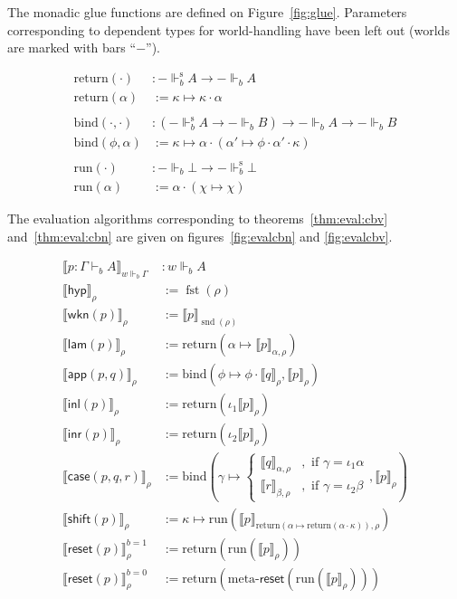 \documentclass{eptcs}
\newcommand{\hyp}{\mathsf{hyp}}
\newcommand{\wkn}[1]{\mathsf{wkn}{(#1)}}
\newcommand{\inl}[1]{\mathsf{inl}{(#1)}}
\newcommand{\inr}[1]{\mathsf{inr}{(#1)}}
\newcommand{\lam}[1]{\mathsf{lam}{(#1)}}
\newcommand{\reset}[1]{\mathsf{reset}{(#1)}}
\newcommand{\shift}[1]{\mathsf{shift}{(#1)}}
\newcommand{\casemy}[3]{\mathsf{case}({#1},{#2},{#3})}
\newcommand{\app}[2]{\mathsf{app}({#1},{#2})}
\DeclareMathOperator{\Fst}{fst}
\DeclareMathOperator{\Snd}{snd}
\newcommand{\forces}[3]{{#1}\Vdash_{#2}{#3}}
\newcommand{\sforces}[3]{{#1}\Vdash^{\text{s}}_{#2}{#3}}
\newcommand{\run}[1]{\text{run}{(#1)}}
\newcommand{\ret}[1]{\text{return}{(#1)}}
\newcommand{\bind}[2]{\text{bind}{(#1,#2)}}
\newcommand{\eval}[2]{\llbracket{#1}\rrbracket_{#2}}
\theoremstyle{definition}
\theoremstyle{plain}
\theoremstyle{remark}
\begin{document}
The monadic glue functions are defined on Figure~\ref{fig:glue}. Parameters corresponding to dependent types for world-handling have been left out (worlds are marked with bars ``$-$'').
\begin{figure*}
\centering
  \begin{align*}
    \ret{\cdot} &: \sforces{-}{b}{A} \to \forces{-}{b}{A}\\
    \ret{\alpha} &:= \kappa\mapsto\kappa\cdot\alpha \\
    ~ & ~\\
\bind{\cdot}{\cdot} &: (\sforces{-}{b}{A} \to \forces{-}{b}{B}) \to \forces{-}{b}{A} \to \forces{-}{b}{B}\\  
    \bind{\phi}{\alpha} &:= \kappa\mapsto\alpha\cdot(\alpha'\mapsto \phi\cdot\alpha'\cdot\kappa)\\  
    ~ & ~\\
\run{\cdot} &: \forces{-}{b}{\bot} \to \sforces{-}{b}{\bot}\\
    \run{\alpha} &:= \alpha\cdot(\chi\mapsto\chi)
  \end{align*}
  \caption{Monadic glue functions}
  \label{fig:glue}
\end{figure*}

The evaluation algorithms corresponding to theorems~\ref{thm:eval:cbv} and~\ref{thm:eval:cbn} are given on figures~\ref{fig:evalcbn} and \ref{fig:evalcbv}.

\begin{figure*}
\centering
  \begin{align*}
    \eval{p : \Gamma\vdash_b A}{\forces{w}{b}{\Gamma}} &: \forces{w}{b}{A}\\
    \eval{\hyp}{\rho} &:= \Fst(\rho)\\
    \eval{\wkn{p}}{\rho} &:= \eval{p}{\Snd(\rho)}\\
    \eval{\lam{p}}{\rho} &:= \ret{\alpha\mapsto\eval{p}{\alpha,\rho}}\\
    \eval{\app{p}{q}}{\rho} &:= \bind{\phi\mapsto\phi\cdot\eval{q}{\rho}}{\eval{p}{\rho}}\\
    \eval{\inl{p}}{\rho} &:= \ret{\iota_1\eval{p}{\rho}}\\
    \eval{\inr{p}}{\rho} &:= \ret{\iota_2\eval{p}{\rho}}\\
    \eval{\casemy{p}{q}{r}}{\rho} &:= \bind{\gamma\mapsto \left\{ 
      \begin{array}{ll}
        \eval{q}{\alpha,\rho} & ,\text{ if } \gamma=\iota_1\alpha\\
        \eval{r}{\beta,\rho} & ,\text{ if } \gamma=\iota_2\beta
      \end{array}        
      \right.}{\eval{p}{\rho}}\\
    \eval{\shift{p}}{\rho} &:= \kappa\mapsto\run{\eval{p}{\ret{\alpha\mapsto\ret{\alpha\cdot\kappa}},\rho}}\\
    \eval{\reset{p}}{\rho}^{b=1} &:=\ret{\run{\eval{p}{\rho}}}\\
    \eval{\reset{p}}{\rho}^{b=0} &:=\ret{\text{meta-}\reset{\run{\eval{p}{\rho}}}}
  \end{align*}
  \caption{Evaluation for call-by-name}
  \label{fig:evalcbn}
\end{figure*}
\end{document}

